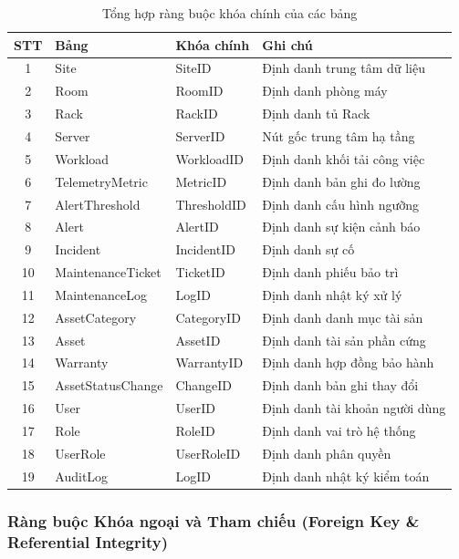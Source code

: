\begin{table}[H]
\centering
\caption{Tổng hợp ràng buộc khóa chính của các bảng}
\label{tab:pk_constraints}
\begin{tabular}{|c|l|l|p{5.5cm}|}
\hline
\textbf{STT} & \textbf{Bảng} & \textbf{Khóa chính} & \textbf{Ghi chú} \\ \hline
1 & Site & SiteID & Định danh trung tâm dữ liệu \\ \hline
2 & Room & RoomID & Định danh phòng máy \\ \hline
3 & Rack & RackID & Định danh tủ Rack \\ \hline
4 & Server & ServerID & Nút gốc trung tâm hạ tầng \\ \hline
5 & Workload & WorkloadID & Định danh khối tải công việc \\ \hline
6 & TelemetryMetric & MetricID & Định danh bản ghi đo lường \\ \hline
7 & AlertThreshold & ThresholdID & Định danh cấu hình ngưỡng \\ \hline
8 & Alert & AlertID & Định danh sự kiện cảnh báo \\ \hline
9 & Incident & IncidentID & Định danh sự cố \\ \hline
10 & MaintenanceTicket & TicketID & Định danh phiếu bảo trì \\ \hline
11 & MaintenanceLog & LogID & Định danh nhật ký xử lý \\ \hline
12 & AssetCategory & CategoryID & Định danh danh mục tài sản \\ \hline
13 & Asset & AssetID & Định danh tài sản phần cứng \\ \hline
14 & Warranty & WarrantyID & Định danh hợp đồng bảo hành \\ \hline
15 & AssetStatusChange & ChangeID & Định danh bản ghi thay đổi \\ \hline
16 & User & UserID & Định danh tài khoản người dùng \\ \hline
17 & Role & RoleID & Định danh vai trò hệ thống \\ \hline
18 & UserRole & UserRoleID & Định danh phân quyền \\ \hline
19 & AuditLog & LogID & Định danh nhật ký kiểm toán \\ \hline
\end{tabular}
\end{table}

\subsubsection{Ràng buộc Khóa ngoại và Tham chiếu (Foreign Key \& Referential Integrity)}

